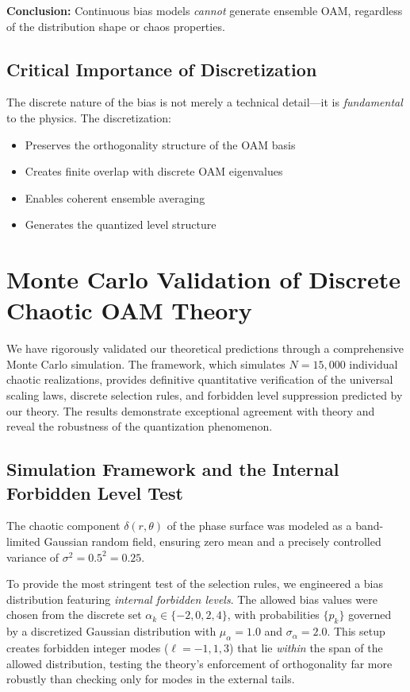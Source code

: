 \documentclass[a4paper,12pt]{article}
\begin{document}
\textbf{Conclusion:} Continuous bias models \emph{cannot} generate ensemble OAM, regardless of the distribution shape or chaos properties.

\subsection{Critical Importance of Discretization}
The discrete nature of the bias is not merely a technical detail—it is \emph{fundamental} to the physics. The discretization:
\begin{itemize}
    \item Preserves the orthogonality structure of the OAM basis
    \item Creates finite overlap with discrete OAM eigenvalues
    \item Enables coherent ensemble averaging
    \item Generates the quantized level structure
\end{itemize}


\section{Monte Carlo Validation of Discrete Chaotic OAM Theory}
\label{sec:Monte Carlo Validation of Discrete Chaotic OAM Theory}
We have rigorously validated our theoretical predictions through a comprehensive Monte Carlo simulation. The framework, which simulates $N=15,000$ individual chaotic realizations, provides definitive quantitative verification of the universal scaling laws, discrete selection rules, and forbidden level suppression predicted by our theory. The results demonstrate exceptional agreement with theory and reveal the robustness of the quantization phenomenon.

\subsection{Simulation Framework and the Internal Forbidden Level Test}

The chaotic component $\delta(r, \theta)$ of the phase surface was modeled as a band-limited Gaussian random field, ensuring zero mean and a precisely controlled variance of $\sigma^2 = 0.5^2 = 0.25$.

To provide the most stringent test of the selection rules, we engineered a bias distribution featuring \textit{internal forbidden levels}. The allowed bias values were chosen from the discrete set $\alpha_k \in \{-2, 0, 2, 4\}$, with probabilities $\{p_k\}$ governed by a discretized Gaussian distribution with $\mu_\alpha=1.0$ and $\sigma_\alpha=2.0$. This setup creates forbidden integer modes ($\ell=-1, 1, 3$) that lie \textit{within} the span of the allowed distribution, testing the theory's enforcement of orthogonality far more robustly than checking only for modes in the external tails.
\end{document}

